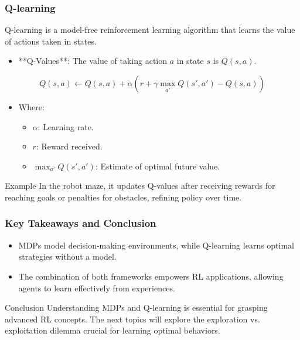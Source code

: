 \documentclass[aspectratio=169]{beamer}
\begin{document}
\begin{frame}[fragile]
    \frametitle{Q-learning}
    \begin{definition}
        Q-learning is a model-free reinforcement learning algorithm that learns the value of actions taken in states.
    \end{definition}
    \begin{itemize}
        \item **Q-Values**: The value of taking action $a$ in state $s$ is \(Q(s,a)\).
    \end{itemize}
    \begin{equation}
        Q(s, a) \leftarrow Q(s, a) + \alpha \left(r + \gamma \max_{a'} Q(s', a') - Q(s, a)\right)
    \end{equation}
    \begin{itemize}
        \item Where:
        \begin{itemize}
            \item $\alpha$: Learning rate.
            \item $r$: Reward received.
            \item $\max_{a'} Q(s', a')$: Estimate of optimal future value.
        \end{itemize}
    \end{itemize}
    \begin{block}{Example}
        In the robot maze, it updates Q-values after receiving rewards for reaching goals or penalties for obstacles, refining policy over time.
    \end{block}
\end{frame}

\begin{frame}[fragile]
    \frametitle{Key Takeaways and Conclusion}
    \begin{itemize}
        \item MDPs model decision-making environments, while Q-learning learns optimal strategies without a model.
        \item The combination of both frameworks empowers RL applications, allowing agents to learn effectively from experiences.
    \end{itemize}
    \begin{block}{Conclusion}
        Understanding MDPs and Q-learning is essential for grasping advanced RL concepts. The next topics will explore the exploration vs. exploitation dilemma crucial for learning optimal behaviors.
    \end{block}
\end{frame}
\end{document}
